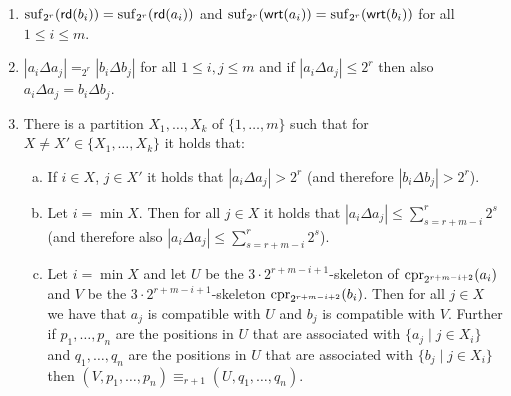 \begin{enumerate}[(1)]
	\item \label{item:E_suffix} $\operatorname{suf}_{2^{r}}(\mathsf{rd}(b_i)) = \operatorname{suf}_{2^{r}}(\mathsf{rd}(a_i))$ and $\operatorname{suf}_{2^{r}}(\mathsf{wrt}(a_i)) = \operatorname{suf}_{2^{r}}(\mathsf{wrt}(b_i))$ for all $1\leq i\leq m$.
	\item\label{item:E_distance} $|a_i \Delta a_j| =_{2^r} |b_i\Delta b_j|$ for all $1\leq i, j\leq m$ and if $|a_i\Delta a_j| \leq 2^r$ then also $a_i \Delta a_j = b_i\Delta b_j$. 
	\item\label{item:E_partition} There is a partition $X_1,\ldots,X_k$ of $\{1,\ldots,m\}$ such that for $X\neq X'\in \{X_1,\ldots,X_k\}$ it holds that: 
	\begin{enumerate}[(a)]
		\item If $i\in X$, $j\in X'$ it holds that $|a_i\Delta a_j| > 2^r$ (and therefore $|b_i\Delta b_j| > 2^r$).
		\item Let $i= \min X$. Then for all $j\in X$ it holds that $|a_i \Delta a_j| \leq \sum_{s= r+m-i}^{r} 2^s$ (and therefore also $|a_i \Delta a_j| \leq \sum_{s= r+m-i}^{r} 2^s$).      
		\item\label{subitem:E_partition:equivalence} Let $i= \min X$ and let $U$ be the $3\cdot 2^{r+m-i+1}$-skeleton of $\operatorname{cpr}_{2^{r+m-i+2}}(a_i)$ and $V$ be the $3\cdot 2^{r+m-i+1}$-skeleton $\operatorname{cpr}_{2^{r+m-i+2}}(b_i)$. Then for all 
		$j\in X$ we have that $a_j$ is compatible with $U$ and $b_j$ is compatible with $V$. Further if $p_1,\ldots, p_n$ are the positions in $U$ that are associated with  $\{a_j \mid j\in X_i \}$ and $q_1,\ldots, q_n$ are the positions in $U$ that are associated with  $\{b_j \mid j\in X_i \}$ then $(V,p_1,\ldots,p_n) \equiv_{r+1} (U,q_1,\ldots,q_n)$.          
	\end{enumerate}  
\end{enumerate} 

